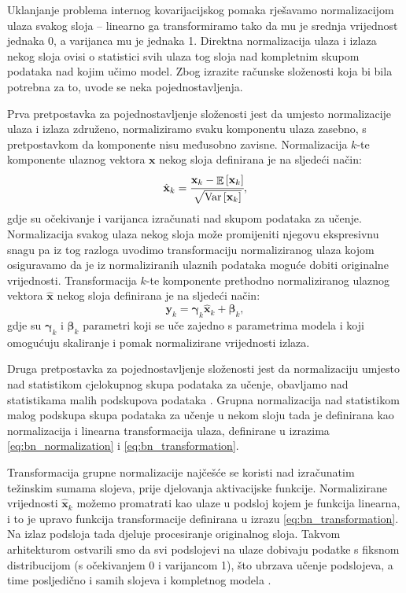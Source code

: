 \documentclass[times, utf8, diplomski, numeric]{fer}
\begin{document}
Uklanjanje problema internog kovarijacijskog pomaka rješavamo normalizacijom ulaza svakog sloja -- linearno ga transformiramo tako da mu je srednja vrijednost jednaka 0, a varijanca mu je jednaka 1.
Direktna normalizacija ulaza i izlaza nekog sloja ovisi o statistici svih ulaza tog sloja nad kompletnim skupom podataka nad kojim učimo model.
Zbog izrazite računske složenosti koja bi bila potrebna za to, uvode se neka pojednostavljenja.

Prva pretpostavka za pojednostavljenje složenosti jest da umjesto normalizacije ulaza i izlaza združeno, normaliziramo svaku komponentu ulaza zasebno, s pretpostavkom da komponente nisu međusobno zavisne.
Normalizacija $k$-te komponente ulaznog vektora $\mathbf{x}$ nekog sloja definirana je na sljedeći način:
\begin{equation}
 \hat{\mathbf{x}}_{k} = \cfrac{\mathbf{x}_{k} - \mathop{\mathbb{E}} \left[ \mathbf{x}_{k} \right]} {\sqrt{ \mathrm{Var} \left[ \mathbf{x}_{k} \right] } }, \label{eq:bn_normalization}
\end{equation}
gdje su očekivanje i varijanca izračunati nad skupom podataka za učenje.
Normalizacija svakog ulaza nekog sloja može promijeniti njegovu ekspresivnu snagu pa iz tog razloga uvodimo transformaciju normaliziranog ulaza kojom osiguravamo da je iz normaliziranih ulaznih podataka moguće dobiti originalne vrijednosti.
Transformacija $k$-te komponente prethodno normaliziranog ulaznog vektora $\hat{\mathbf{x}}$ nekog sloja definirana je na sljedeći način:
\begin{equation}
 \mathbf{y}_{k} = \boldsymbol{\gamma}_{k} \hat{\mathbf{x}}_{k} + \boldsymbol{\beta}_{k}, \label{eq:bn_transformation}
\end{equation}
gdje su $\boldsymbol{\gamma}_{k}$ i $\boldsymbol{\beta}_{k}$ parametri koji se uče zajedno s parametrima modela i koji omogućuju skaliranje i pomak normalizirane vrijednosti izlaza.

Druga pretpostavka za pojednostavljenje složenosti jest da normalizaciju umjesto nad statistikom cjelokupnog skupa podataka za učenje, obavljamo nad statistikama malih podskupova podataka .
Grupna normalizacija nad statistikom malog podskupa skupa podataka za učenje u nekom sloju tada je definirana kao normalizacija i linearna transformacija ulaza, definirane u izrazima \ref{eq:bn_normalization} i \ref{eq:bn_transformation}.

Transformacija grupne normalizacije najčešće se koristi nad izračunatim težinskim sumama slojeva, prije djelovanja aktivacijske funkcije.
Normalizirane vrijednosti $\hat{\mathbf{x}}_{k}$ možemo promatrati kao ulaze u podsloj kojem je funkcija linearna, i to je upravo funkcija transformacije definirana u izrazu \ref{eq:bn_transformation}.
Na izlaz podsloja tada djeluje procesiranje originalnog sloja. 
Takvom arhitekturom ostvarili smo da svi podslojevi na ulaze dobivaju podatke s fiksnom distribucijom (s očekivanjem 0 i varijancom 1), što ubrzava učenje podslojeva, a time posljedično i samih slojeva i kompletnog modela \citep{article:bn_paper} \citep{seminar:rela}.
\end{document}
